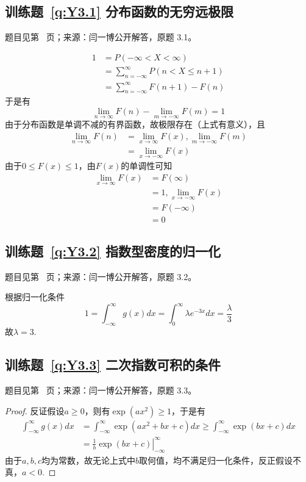 \subsection*{训练题~\ref{q:Y3.1} 分布函数的无穷远极限}\label{a:Y3.1}{\small 题目见第~\pageref{q:Y3.1} 页；来源：闫一博公开解答，原题 3.1。}
\begin{solve}
\[\begin{aligned}1&=P( - \infty  < X < \infty ) \\&= \sum\limits_{n =  - \infty }^\infty  {P(n < X \leqslant n + 1)}  \\&= \sum\limits_{n =  - \infty }^\infty  {F(n + 1) - F(n)} \end{aligned}\]
于是有
\[\mathop {\lim }\limits_{n \to \infty } F(n) - \mathop {\lim }\limits_{m \to  - \infty } F(m) = 1\]
由于分布函数是单调不减的有界函数，故极限存在（上式有意义），且
\[\begin{aligned}\mathop {\lim }\limits_{n \to   \infty } F\left( n \right) &= \mathop {\lim }\limits_{x \to   \infty } F(x),\mathop {\lim }\limits_{m \to  - \infty } F\left( m \right) \\&= \mathop {\lim }\limits_{x \to  - \infty } F(x)\end{aligned}\]
由于$0\leqslant F(x)\leqslant 1$，由$F(x)$的单调性可知
\[\begin{aligned}\mathop {\lim }\limits_{x \to \infty } F(x) &= F(\infty ) \\&= 1,\mathop {\lim }\limits_{x \to  - \infty } F(x) \\&= F( - \infty ) \\&= 0\end{aligned}\]
\end{solve}

\subsection*{训练题~\ref{q:Y3.2} 指数型密度的归一化}\label{a:Y3.2}{\small 题目见第~\pageref{q:Y3.2} 页；来源：闫一博公开解答，原题 3.2。}
\begin{solve}
根据归一化条件
\[1 = \int_{ - \infty }^\infty  {g(x)dx}  = \int_0^\infty  {\lambda {e^{ - 3x}}dx}  = \frac{\lambda }{3}\]
故$\lambda=3$.
\end{solve}

\subsection*{训练题~\ref{q:Y3.3} 二次指数可积的条件}\label{a:Y3.3}{\small 题目见第~\pageref{q:Y3.3} 页；来源：闫一博公开解答，原题 3.3。}
\begin{proof}
反证假设$a\geqslant 0$，则有$\exp(ax^2)\geqslant 1$，于是有
\[\begin{aligned}\int_{ - \infty }^\infty  {g(x)dx}  &= \int_{ - \infty }^\infty  {\exp (a{x^2} + bx + c)dx}  \geqslant \int_{ - \infty }^\infty  {\exp (bx + c)dx}  \\&= \left. {\frac{1}{b}\exp (bx + c)} \right|_{ - \infty }^\infty \end{aligned}\]
由于$a,b,c$均为常数，故无论上式中$b$取何值，均不满足归一化条件，反正假设不真，$a<0$.
\end{proof}

